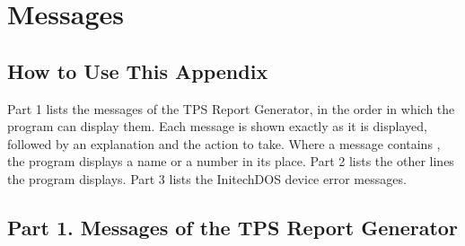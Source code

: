 \chapter{Messages}

\section{How to Use This Appendix}
Part 1 lists the messages of the TPS Report Generator, in the order in which
the program can display them.  Each message is shown exactly as it is
displayed, followed by an explanation and the action to take.  Where a
message contains , the program displays a name or a number in its
place.  Part 2 lists the other lines the program displays.  Part 3 lists the
InitechDOS device error messages.

\section{Part 1. Messages of the TPS Report Generator}


